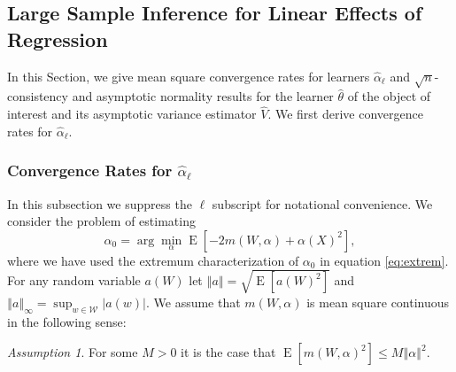 \documentclass[aos]{imsart}
\numberwithin{equation}{section}
\theoremstyle{plain}
\theoremstyle{remark}
\newtheorem{assumption}{Assumption}
\DeclareMathOperator{\E}{E}
\begin{document}


\subsection{Large Sample Inference for Linear Effects of Regression}

In this Section, we give mean square convergence rates for learners $\hat{\alpha}_{\ell}$ and $\sqrt{n}$-consistency and asymptotic normality results for the learner $\hat{\theta}$ of the object of interest and its asymptotic variance estimator $\hat{V}$. We first derive convergence rates for $\hat{\alpha}_{\ell}.$

\subsubsection{Convergence Rates for $\hat{\alpha}_{\ell}$ \label{sec:largesampalpha}}
In this subsection we suppress the $\ell$ subscript for notational convenience.
We consider the problem of estimating
\[
\alpha_{0}=\arg\min_{\alpha}\E[-2m(W,\alpha)+\alpha(X)^{2}],
\]
where we have used the extremum characterization of $\alpha_0$ in equation \eqref{eq:extrem}. For any random variable $a(W)$ let $\left\Vert a\right\Vert
=\sqrt{\E[a(W)^{2}]}$ and $\left\Vert a\right\Vert _{\infty}=\sup
_{w\in\mathcal{W}}\left\vert a(w)\right\vert.$  
We assume that $m(W,\alpha)$ is mean square continuous in the following sense:
\begin{assumption}\label{ass1}
For some $M > 0$ it is the case that $\E[m(W,\alpha)^{2}] \leq M\left\Vert \alpha\right\Vert ^{2}$. 
\end{assumption}
\end{document}

